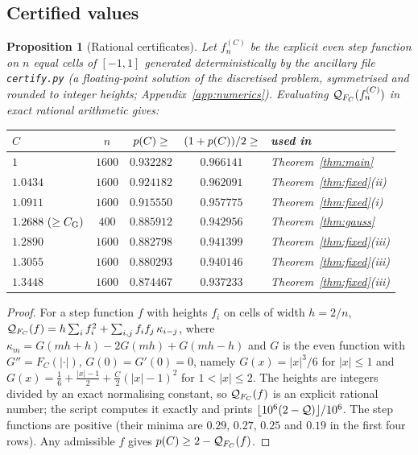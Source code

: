 \documentclass[11pt]{amsart}
\newtheorem{proposition}[theorem]{Proposition}
\theoremstyle{definition}
\theoremstyle{remark}
\numberwithin{equation}{section}
\begin{document}
\subsection{Certified values}
\begin{proposition}[Rational certificates]\label{prop:cert}
Let $f_n^{(C)}$ be the explicit even step function on $n$ equal cells of $[-1,1]$ generated deterministically by the ancillary file \texttt{certify.py} (a floating-point solution of the discretised problem, symmetrised and rounded to integer heights; Appendix~\ref{app:numerics}). Evaluating $\mathcal Q_{F_C}(f_n^{(C)})$ in exact rational arithmetic gives:
\begin{center}\small
\begin{tabular}{@{}lcccl@{}}
\toprule
$C$ & $n$ & $p(C)\ge$ & $(1+p(C))/2\ge$ & used in\\
\midrule
$1$ & $1600$ & $0.932282$ & $0.966141$ & Theorem~\ref{thm:main}\\
$1.0434$ & $1600$ & $0.924182$ & $0.962091$ & Theorem~\ref{thm:fixed}(ii)\\
$1.0911$ & $1600$ & $0.915550$ & $0.957775$ & Theorem~\ref{thm:fixed}(i)\\
$1.2688\ (\ge\CG)$ & $400$ & $0.885912$ & $0.942956$ & Theorem~\ref{thm:gauss}\\
$1.2890$ & $1600$ & $0.882798$ & $0.941399$ & Theorem~\ref{thm:fixed}(iii)\\
$1.3055$ & $1600$ & $0.880293$ & $0.940146$ & Theorem~\ref{thm:fixed}(iii)\\
$1.3448$ & $1600$ & $0.874467$ & $0.937233$ & Theorem~\ref{thm:fixed}(iii)\\
\bottomrule
\end{tabular}
\end{center}
\end{proposition}
\begin{proof}
For a step function $f$ with heights $f_i$ on cells of width $h=2/n$, $\mathcal Q_{F_C}(f)=h\sum_if_i^2+\sum_{i,j}f_if_j\,\kappa_{i-j}$, where $\kappa_m=G(mh+h)-2G(mh)+G(mh-h)$ and $G$ is the even function with $G''=F_C(|\cdot|)$, $G(0)=G'(0)=0$, namely $G(x)=|x|^3/6$ for $|x|\le1$ and $G(x)=\frac16+\frac{|x|-1}2+\frac C2(|x|-1)^2$ for $1<|x|\le2$. The heights are integers divided by an exact normalising constant, so $\mathcal Q_{F_C}(f)$ is an explicit rational number; the script computes it exactly and prints $\lfloor10^6(2-\mathcal Q)\rfloor/10^6$. The step functions are positive (their minima are $0.29$, $0.27$, $0.25$ and $0.19$ in the first four rows). Any admissible $f$ gives $p(C)\ge2-\mathcal Q_{F_C}(f)$.
\end{proof}
\end{document}

